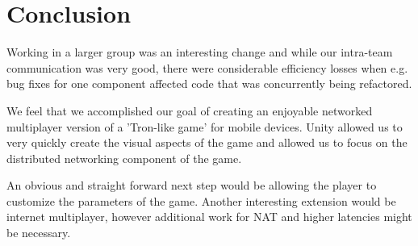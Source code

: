 \documentclass{report}
\begin{document}
 \balancecolumns
 
\section{Conclusion}
 Working in a larger group was an interesting change and while our intra-team communication was very good, there were considerable efficiency losses when e.g. bug fixes for one component affected code that was concurrently being refactored. 

 We feel that we accomplished our goal of creating an enjoyable  networked multiplayer version of a 'Tron-like game' for mobile devices. Unity allowed us to very quickly create the visual aspects of the game and allowed us to focus on the distributed networking component of the game.

An obvious and straight forward next step would be allowing the  player to customize the parameters of the game. Another interesting extension would be internet multiplayer, however additional work for NAT and higher latencies might be necessary.


\nocite{*}

 \balancecolumns
\end{document}
